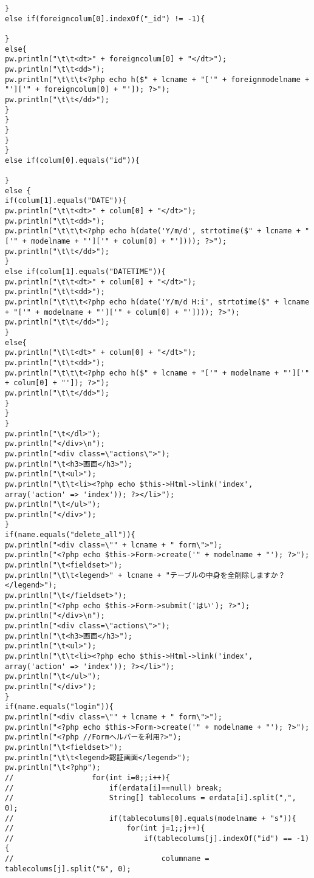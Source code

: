 \documentclass{funthesis}
\begin{document}
\begin{lstlisting}[caption=WriteView.java,label=1]
}
else if(foreigncolum[0].indexOf("_id") != -1){

}
else{
pw.println("\t\t<dt>" + foreigncolum[0] + "</dt>");
pw.println("\t\t<dd>");
pw.println("\t\t\t<?php echo h($" + lcname + "['" + foreignmodelname + "']['" + foreigncolum[0] + "']); ?>");
pw.println("\t\t</dd>");	
}
}
}
}
}
else if(colum[0].equals("id")){

}
else {
if(colum[1].equals("DATE")){
pw.println("\t\t<dt>" + colum[0] + "</dt>");
pw.println("\t\t<dd>");	
pw.println("\t\t\t<?php echo h(date('Y/m/d', strtotime($" + lcname + "['" + modelname + "']['" + colum[0] + "']))); ?>");
pw.println("\t\t</dd>");	
}
else if(colum[1].equals("DATETIME")){
pw.println("\t\t<dt>" + colum[0] + "</dt>");
pw.println("\t\t<dd>");	
pw.println("\t\t\t<?php echo h(date('Y/m/d H:i', strtotime($" + lcname + "['" + modelname + "']['" + colum[0] + "']))); ?>");
pw.println("\t\t</dd>");	
}
else{
pw.println("\t\t<dt>" + colum[0] + "</dt>");
pw.println("\t\t<dd>");	
pw.println("\t\t\t<?php echo h($" + lcname + "['" + modelname + "']['" + colum[0] + "']); ?>");
pw.println("\t\t</dd>");
}
}
}
pw.println("\t</dl>");
pw.println("</div>\n");
pw.println("<div class=\"actions\">");
pw.println("\t<h3>画面</h3>");
pw.println("\t<ul>");
pw.println("\t\t<li><?php echo $this->Html->link('index', array('action' => 'index')); ?></li>");
pw.println("\t</ul>");
pw.println("</div>");
}
if(name.equals("delete_all")){
pw.println("<div class=\"" + lcname + " form\">");
pw.println("<?php echo $this->Form->create('" + modelname + "'); ?>");
pw.println("\t<fieldset>");
pw.println("\t\t<legend>" + lcname + "テーブルの中身を全削除しますか？</legend>");
pw.println("\t</fieldset>");
pw.println("<?php echo $this->Form->submit('はい'); ?>");
pw.println("</div>\n");
pw.println("<div class=\"actions\">");
pw.println("\t<h3>画面</h3>");
pw.println("\t<ul>");
pw.println("\t\t<li><?php echo $this->Html->link('index', array('action' => 'index')); ?></li>");
pw.println("\t</ul>");
pw.println("</div>");
}
if(name.equals("login")){
pw.println("<div class=\"" + lcname + " form\">");
pw.println("<?php echo $this->Form->create('" + modelname + "'); ?>");
pw.println("<?php //Formヘルパーを利用?>");
pw.println("\t<fieldset>");
pw.println("\t\t<legend>認証画面</legend>");
pw.println("\t<?php");
//					for(int i=0;;i++){
//						if(erdata[i]==null) break;
//						String[] tablecolums = erdata[i].split(",", 0);
//						if(tablecolums[0].equals(modelname + "s")){
//							for(int j=1;;j++){
//								if(tablecolums[j].indexOf("id") == -1){
//									columname = tablecolums[j].split("&", 0);

\end{lstlisting}
\end{document}

